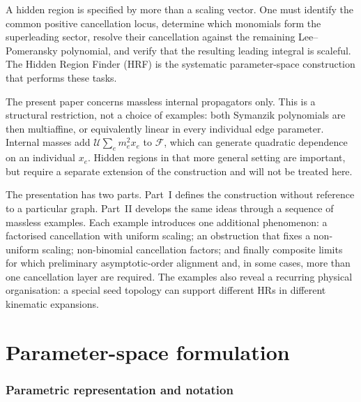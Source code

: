 \documentclass[a4paper,11pt]{article}
\begin{document}
A hidden region is specified by more than a scaling vector.  One must
identify the common positive cancellation locus, determine which monomials
form the superleading sector, resolve their cancellation against the
remaining Lee--Pomeransky polynomial, and verify that the resulting leading
integral is scaleful.  The Hidden Region Finder (HRF) is the systematic
parameter-space construction that performs these tasks.

The present paper concerns massless internal propagators only.  This is a
structural restriction, not a choice of examples: both Symanzik polynomials
are then multiaffine, or equivalently linear in every individual edge
parameter.  Internal masses add
\(\mathcal U\sum_e m_e^2x_e\) to \(\mathcal F\), which can generate
quadratic dependence on an individual \(x_e\).  Hidden regions in that more
general setting are important, but require a separate extension of the
construction and will not be treated here.

The presentation has two parts.  Part~I defines the construction without
reference to a particular graph.  Part~II develops the same ideas through a
sequence of massless examples.  Each example introduces one additional
phenomenon: a factorised cancellation with uniform scaling; an obstruction
that fixes a non-uniform scaling; non-binomial cancellation factors; and
finally composite limits for which preliminary asymptotic-order alignment
and, in some cases, more than one cancellation layer are required.  The
examples also reveal a recurring physical organisation: a special seed
topology can support different HRs in different kinematic expansions.

\part{Parameter-space formulation}

\section{Parametric representation and notation}
\label{sec:notation}
\end{document}
